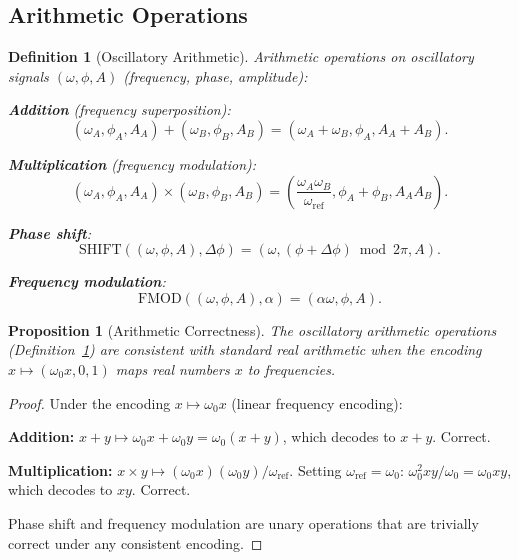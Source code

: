 \documentclass[twocolumn,10pt]{article}
\newtheorem{proposition}[theorem]{Proposition}
\newtheorem{definition}[theorem]{Definition}
\theoremstyle{remark}
\begin{document}
\subsection{Arithmetic Operations}

\begin{definition}[Oscillatory Arithmetic]
\label{def:arithmetic}
Arithmetic operations on oscillatory signals $(\omega, \phi, A)$ (frequency, phase, amplitude):

\textbf{Addition} (frequency superposition):
\begin{equation}
(\omega_A, \phi_A, A_A) + (\omega_B, \phi_B, A_B) = (\omega_A + \omega_B, \phi_A, A_A + A_B).
\label{eq:add}
\end{equation}

\textbf{Multiplication} (frequency modulation):
\begin{equation}
(\omega_A, \phi_A, A_A) \times (\omega_B, \phi_B, A_B) = \!\left(\frac{\omega_A \omega_B}{\omega_{\mathrm{ref}}}, \phi_A + \phi_B, A_A A_B\right).
\label{eq:mult}
\end{equation}

\textbf{Phase shift}:
\begin{equation}
\mathrm{SHIFT}((\omega, \phi, A), \Delta\phi) = (\omega, (\phi + \Delta\phi) \bmod 2\pi, A).
\label{eq:shift}
\end{equation}

\textbf{Frequency modulation}:
\begin{equation}
\mathrm{FMOD}((\omega, \phi, A), \alpha) = (\alpha\omega, \phi, A).
\label{eq:fmod}
\end{equation}
\end{definition}

\begin{proposition}[Arithmetic Correctness]
\label{prop:arithmetic}
The oscillatory arithmetic operations (Definition~\ref{def:arithmetic}) are consistent with standard real arithmetic when the encoding $x \mapsto (\omega_0 x, 0, 1)$ maps real numbers $x$ to frequencies.
\end{proposition}

\begin{proof}
Under the encoding $x \mapsto \omega_0 x$ (linear frequency encoding):

\textbf{Addition:} $x + y \mapsto \omega_0 x + \omega_0 y = \omega_0(x + y)$, which decodes to $x + y$. Correct.

\textbf{Multiplication:} $x \times y \mapsto (\omega_0 x)(\omega_0 y)/\omega_{\mathrm{ref}}$. Setting $\omega_{\mathrm{ref}} = \omega_0$: $\omega_0^2 xy / \omega_0 = \omega_0 xy$, which decodes to $xy$. Correct.

Phase shift and frequency modulation are unary operations that are trivially correct under any consistent encoding.
\end{proof}
\end{document}
